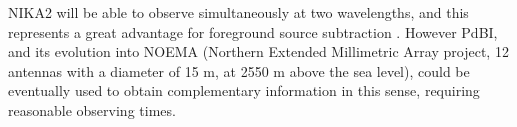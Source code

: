 \documentclass[11pt,a4paper,twoside,graphicx,color]{article}
\begin{document}

NIKA2 will be able to observe simultaneously at two wavelengths, and this represents a great advantage for foreground source subtraction \citep[][Adam \& NIKA collaboration in prep.]{Adam2015}. However PdBI, and its evolution into NOEMA (Northern Extended Millimetric Array project, 12 antennas with a diameter of 15 m, at 2550 m above the sea level), could be eventually used to obtain complementary information in this sense, requiring reasonable observing times.
\end{document}

